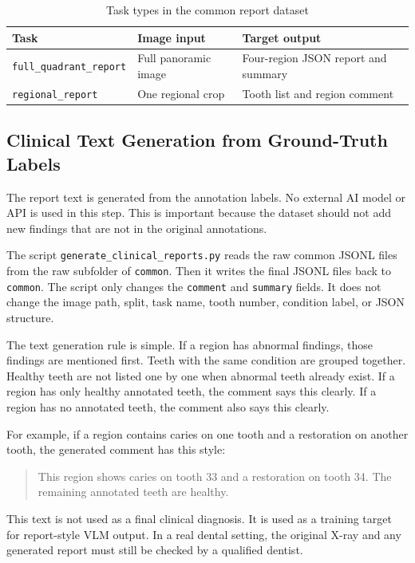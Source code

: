 \documentclass[a4paper,12pt]{report}
\begin{document}
\begin{table}[H]
\centering
\caption{Task types in the common report dataset}
\begin{tabular}{llp{5.6cm}}
\toprule
Task & Image input & Target output \\
\midrule
\texttt{full\_quadrant\_report} & Full panoramic image & Four-region JSON report and summary \\
\texttt{regional\_report} & One regional crop & Tooth list and region comment \\
\bottomrule
\end{tabular}
\end{table}

\newpage
\subsection{Clinical Text Generation from Ground-Truth Labels}

The report text is generated from the annotation labels. No external AI model or API is used in this step. This is important because the dataset should not add new findings that are not in the original annotations.

The script \texttt{generate\_clinical\_reports.py} reads the raw common JSONL files from the raw subfolder of \texttt{common}. Then it writes the final JSONL files back to \texttt{common}. The script only changes the \texttt{comment} and \texttt{summary} fields. It does not change the image path, split, task name, tooth number, condition label, or JSON structure.

The text generation rule is simple. If a region has abnormal findings, those findings are mentioned first. Teeth with the same condition are grouped together. Healthy teeth are not listed one by one when abnormal teeth already exist. If a region has only healthy annotated teeth, the comment says this clearly. If a region has no annotated teeth, the comment also says this clearly.

For example, if a region contains caries on one tooth and a restoration on another tooth, the generated comment has this style:

\begin{quote}
This region shows caries on tooth 33 and a restoration on tooth 34. The remaining annotated teeth are healthy.
\end{quote}

This text is not used as a final clinical diagnosis. It is used as a training target for report-style VLM output. In a real dental setting, the original X-ray and any generated report must still be checked by a qualified dentist.
\end{document}
